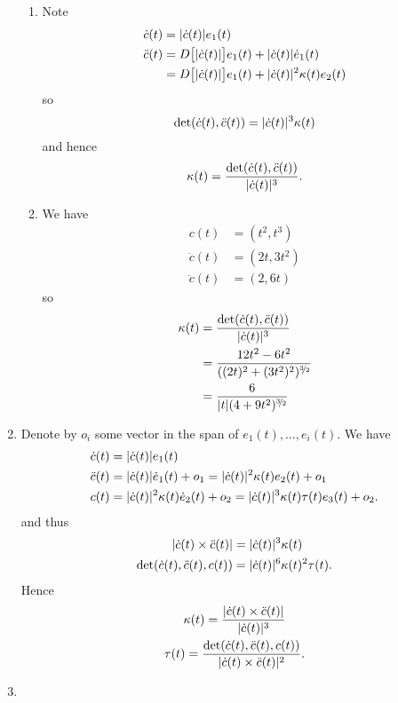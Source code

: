 \documentclass[a4paper, 12pt]{article}
\DeclarePairedDelimiter\abs{\lvert}{\rvert}
\let\dddot\relax
\begin{document}
\begin{enumerate}
\begin{enumerate}
\item Note
\begin{align*}
\dot c(t)&=\abs{\dot c(t)}e_1(t)\\
\ddot c(t)&=D\big[\abs{\dot c(t)}\big]e_1(t)+\abs{\dot c(t)}\dot e_1(t)\\
&=D\big[\abs{\dot c(t)}\big]e_1(t)+\abs{\dot c(t)}^2\kappa(t)e_2(t)
\end{align*}
so
\[\det(\dot c(t),\ddot c(t))=\abs{\dot c(t)}^3\kappa(t)\]
and hence
\[\kappa(t)=\frac{\det(\dot c(t),\ddot c(t))}{\abs{\dot c(t)}^3}.\]

\item We have
\begin{align*}
c(t)&=(t^2,t^3)\\
\dot c(t)&=(2t,3t^2)\\
\ddot c(t)&=(2,6t)
\end{align*}
so
\begin{align*}
\kappa(t)&=\frac{\det(\dot c(t),\ddot c(t))}{\abs{\dot c(t)}^3}\\
&=\frac{12t^2-6t^2}{((2t)^2+(3t^2)^2)^{\sfrac{3\!}2}}\\
&=\frac{6}{\abs{t}(4+9t^2)^{\sfrac{3\!}2}}
\end{align*}

\end{enumerate}

\item Denote by \(o_i\) some vector in the span of \(e_1(t),\dots,e_i(t)\). We have
\begin{align*}
\dot c(t)&=\abs{\dot c(t)}e_1(t)\\
\ddot c(t)&=\abs{\dot c(t)}\dot e_1(t)+o_1=\abs{\dot c(t)}^2\kappa(t)e_2(t)+o_1\\
\dddot c(t)&=\abs{\dot c(t)}^2\kappa(t)\dot e_2(t)+o_2=\abs{\dot c(t)}^3\kappa(t)\tau(t)e_3(t)+o_2.
\end{align*}
and thus
\begin{align*}
\abs{\dot c(t)\times\ddot c(t)}&=\abs{\dot c(t)}^3\kappa(t)\\
\det(\dot c(t),\ddot c(t),\dddot c(t))&=\abs{\dot c(t)}^6\kappa(t)^2\tau(t).
\end{align*}
Hence
\begin{gather*}
\kappa(t)=\frac{\abs{\dot c(t)\times\ddot c(t)}}{\abs{\dot c(t)}^3}\\
\tau(t)=\frac{\det(\dot c(t),\ddot c(t),\dddot c(t))}{\abs{\dot c(t)\times\ddot c(t)}^2}.
\end{gather*}

\item \begin{enumerate}


\end{enumerate}
\end{enumerate}
\end{document}
